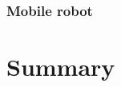 \documentclass[printmode,en]{mgr}
\begin{document}
\subsection{Mobile robot}


\chapter{Summary}
\appendix




\end{document}
